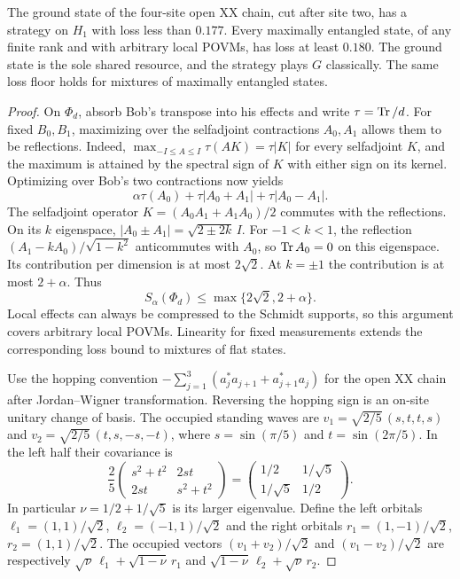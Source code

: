\begin{theorem}\label{thm:finite-chain-hybrid}
The ground state of the four-site open XX chain, cut after site two, has a
strategy on $H_1$ with loss less than $0.177$. Every maximally entangled state,
of any finite rank and with arbitrary local POVMs, has loss at least $0.180$.
The ground state is the sole shared resource, and the strategy plays $G$
classically. The same loss floor holds for mixtures of maximally entangled
states.
\end{theorem}

\begin{proof}
On $\Phi_d$, absorb Bob's transpose into his effects and write
$\tau=\operatorname{Tr}/d$. For fixed $B_0,B_1$, maximizing over the selfadjoint
contractions $A_0,A_1$ allows them to be reflections. Indeed,
$\max_{-I\le A\le I}\tau(AK)=\tau|K|$ for every selfadjoint $K$, and the
maximum is attained by the spectral sign of $K$ with either sign on its kernel.
Optimizing over Bob's two contractions now yields
\[
 \alpha\tau(A_0)+\tau|A_0+A_1|+\tau|A_0-A_1|.
\]
The selfadjoint operator $K=(A_0A_1+A_1A_0)/2$ commutes with the reflections.
On its $k$ eigenspace, $|A_0\pm A_1|=\sqrt{2\pm2k}\,I$.
For $-1<k<1$, the reflection $(A_1-kA_0)/\sqrt{1-k^2}$ anticommutes
with $A_0$, so $\operatorname{Tr} A_0=0$ on this eigenspace. Its contribution per
dimension is at most $2\sqrt2$. At $k=\pm1$ the contribution is at most
$2+\alpha$. Thus
\begin{equation}\label{eq:tilted-tracial}
 S_\alpha(\Phi_d)\le\max\{2\sqrt2,2+\alpha\}.
\end{equation}
Local effects can always be compressed to the Schmidt supports, so this
argument covers arbitrary local POVMs. Linearity for fixed measurements
extends the corresponding loss bound to mixtures of flat states.

Use the hopping convention $-\sum_{j=1}^3(a_j^*a_{j+1}+a_{j+1}^*a_j)$ for
the open XX chain after Jordan--Wigner transformation. Reversing the hopping
sign is an on-site unitary change of basis. The occupied standing waves are
$v_1=\sqrt{2/5}\,(s,t,t,s)$ and $v_2=\sqrt{2/5}\,(t,s,-s,-t)$, where
$s=\sin(\pi/5)$ and $t=\sin(2\pi/5)$. In the left half their covariance is
\[
 \frac25\begin{pmatrix}s^2+t^2&2st\\2st&s^2+t^2\end{pmatrix}
   =\begin{pmatrix}1/2&1/\sqrt5\\1/\sqrt5&1/2\end{pmatrix}.
\]
In particular $\nu=1/2+1/\sqrt5$ is its larger eigenvalue. Define the
left orbitals $\ell_1=(1,1)/\sqrt2$, $\ell_2=(-1,1)/\sqrt2$ and the
right orbitals $r_1=(1,-1)/\sqrt2$, $r_2=(1,1)/\sqrt2$. The occupied
vectors $(v_1+v_2)/\sqrt2$ and $(v_1-v_2)/\sqrt2$ are respectively
$\sqrt\nu\,\ell_1+\sqrt{1-\nu}\,r_1$ and
$\sqrt{1-\nu}\,\ell_2+\sqrt\nu\,r_2$.


\end{proof}
